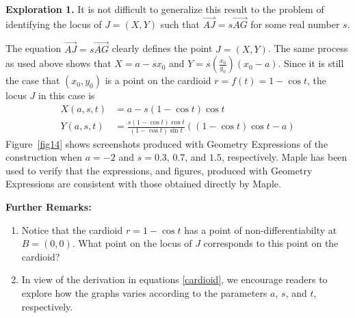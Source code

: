 \documentclass[12pt,a4paper]{article}%
\begin{document}
\textbf{Exploration 1. }
It is not difficult to generalize this result to the problem of
identifying the locus of $J=(X,Y)$ such that $\overrightarrow{AJ}=s\overrightarrow{AG}$ for
some real number $s$.

The equation $\overrightarrow{AJ}=s\overrightarrow{AG}$ clearly defines the point $J=(X,Y)$.
The same process as used above shows that $X=a-sx_{0}$ and $Y=s\left( \frac{x_{0}}{y_{0}} \right) (x_{0}-a)$.
Since it is still the case that $\left(  x_{0},y_{0}\right)  $ is a point on the
cardioid $r=f(t)=1-\cos t$, the locus $J$ in this case is
\begin{align}
X(a,s,t)  & =a-s\left(  1-\cos t\right)  \cos t\label{cardioid}\\
Y(a,s,t)  & =\frac{s\left(  1-\cos t\right)  \cos t}{\left(  1-\cos t\right)
\sin t}\left(  \left(  1-\cos t\right)  \cos t-a\right) \nonumber
\end{align}
Figure~\ref{fig14} shows screenshots produced with Geometry Expressions \cite{GE}
of the construction when $a=-2$ and $s=0.3$, $0.7$, and $1.5$,
respectively. Maple \cite{Maple} has been used to verify that the expressions, and figures,
produced with Geometry Expressions \cite{GE} are consistent with those obtained directly
by Maple.

\textbf{Further Remarks: }
\begin{enumerate}
\item Notice that the cardioid $r=1-\cos t$ has a point of non-differentiabilty at $B=(0,0)$.
What point on the locus of $J$ corresponds to this point on the cardioid?

\item In view of the derivation in equations \ref{cardioid}, we encourage
readers to explore how the graphs varies according to the parameters $a$, $s$,
and $t$, respectively.
\end{enumerate}
\end{document}

